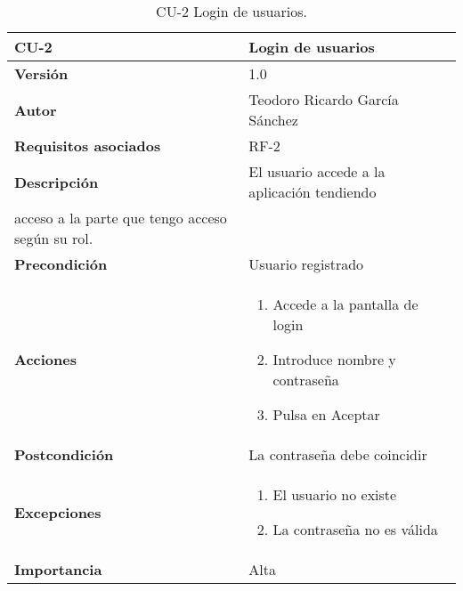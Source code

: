 \begin{table}[p]
	\centering
	\begin{tabularx}{\linewidth}{ p{} p{} }
		\toprule
		\textbf{CU-2}    & \textbf{Login de usuarios}\\
		\toprule
		\textbf{Versión}              & 1.0    \\
		\textbf{Autor}                & Teodoro Ricardo García Sánchez \\
		\textbf{Requisitos asociados} & RF-2 \\
		\textbf{Descripción}          & El usuario accede a la aplicación tendiendo \\
										acceso a la parte que tengo acceso según su rol. \\
		\textbf{Precondición}         & Usuario registrado \\
		\textbf{Acciones}             &
		\begin{enumerate}
			\def\labelenumi{\arabic{enumi}.}
			\tightlist
			\item Accede a la pantalla de login 
			\item Introduce nombre y contraseña
			\item Pulsa en Aceptar
		\end{enumerate}\\
		\textbf{Postcondición}        & La contraseña debe coincidir \\
		\textbf{Excepciones}          & 
		\begin{enumerate}
			\def\labelenumi{\arabic{enumi}.}
			\tightlist
			\item El usuario no existe 
			\item La contraseña no es válida 
		\end{enumerate}\\
		\textbf{Importancia}          & Alta\\
		\bottomrule
	\end{tabularx}
	\caption{CU-2 Login de usuarios.}
\end{table}
